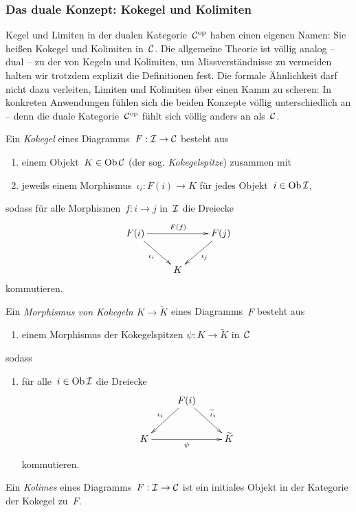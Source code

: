 \subsubsection*{Das duale Konzept: Kokegel und Kolimiten}

Kegel und Limiten in der dualen Kategorie~$\mathcal{C}^{\mathrm{op}}$ haben einen eigenen Namen:
Sie heißen Kokegel und Kolimiten in~$\mathcal{C}$. Die allgemeine Theorie ist völlig
analog -- dual -- zu der von Kegeln und Kolimiten, um Missverständnisse zu
vermeiden halten wir trotzdem explizit die Definitionen fest. Die formale
Ähnlichkeit darf nicht dazu verleiten, Limiten und Kolimiten über einen Kamm zu
scheren: In konkreten Anwendungen fühlen sich die beiden Konzepte völlig
unterschiedlich an -- denn die duale Kategorie~$\mathcal{C}^{\mathrm{op}}$ fühlt sich völlig
anders an als~$\mathcal{C}$.

\begin{defn}Ein \emph{Kokegel} eines Diagramms~$F : \mathcal{I} \to \mathcal{C}$ besteht aus
\begin{enumerate}
\item einem Objekt~$K \in \operatorname{Ob} \mathcal{C}$ (der sog. \emph{Kokegelspitze}) zusammen mit
\item jeweils einem Morphismus~$\iota_i : F(i) \to K$ für jedes Objekt~$i \in \operatorname{Ob}\mathcal{I}$,
\end{enumerate}
sodass
für alle Morphismen~$f : i \to j$ in~$\mathcal{I}$ die Dreiecke
\[ \xymatrix{
  F(i) \ar[rd]_{\iota_i} \ar[rr]^{F(f)} && F(j) \ar[ld]^{\iota_j} \\
  & K
} \]
kommutieren.
\end{defn}

\begin{defn}Ein \emph{Morphismus von Kokegeln $K \to \widetilde K$} eines Diagramms~$F$ besteht aus
\begin{enumerate}
\item[] einem Morphismus der Kokegelspitzen $\psi : K \to \widetilde K$ in~$\mathcal{C}$
\end{enumerate}
sodass
\begin{enumerate}
\item[]
für alle~$i \in \operatorname{Ob}\mathcal{I}$ die Dreiecke
\[ \xymatrix{
  & F(i) \ar[ld]_{\iota_i} \ar[rd]^{\widetilde\iota_i} \\
  K \ar[rr]_{\psi} && \widetilde K
} \]
kommutieren.
\end{enumerate}
\end{defn}

\begin{defn}Ein \emph{Kolimes} eines Diagramms~$F:\mathcal{I}\to\mathcal{C}$ ist ein initiales
Objekt in der Kategorie der Kokegel zu~$F$.\end{defn}

